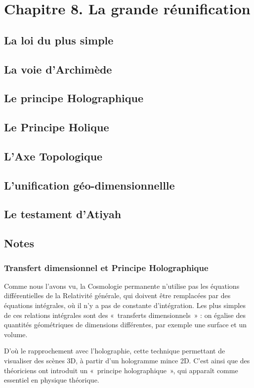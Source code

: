 \documentclass[a4paper,12pt]{article}
\begin{document}
\section{Chapitre 8. La grande réunification}
\subsection{La loi du plus simple}
\subsection{La voie d'Archimède}
\subsection{Le principe Holographique}
\subsection{Le Principe Holique}
\subsection{L'Axe Topologique}
\subsection{L'unification géo-dimensionnellle}
\subsection{Le testament d'Atiyah}




\subsection{Notes}
\subsubsection{Transfert dimensionnel et Principe Holographique }
 
Comme nous l'avons vu, la Cosmologie permanente n'utilise pas les équations différentielles de la Relativité générale, qui doivent être remplacées par des équations intégrales, où il n'y a pas de constante d'intégration. Les plus simples de ces relations intégrales sont des « transferts dimensionnels » : on égalise des quantités géométriques de dimensions différentes, par exemple une surface et un volume.


D'où le rapprochement avec l'holographie, cette technique permettant de visualiser des scènes 3D, à partir d'un hologramme mince 2D. C'est ainsi que des théoriciens ont introduit un « principe holographique », qui apparaît comme essentiel en physique théorique.
\end{document}
